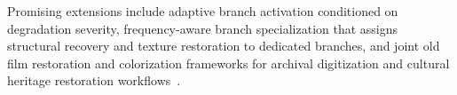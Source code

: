 Promising extensions include adaptive branch activation conditioned on degradation severity, frequency-aware branch specialization that assigns structural recovery and texture restoration to dedicated branches, and joint old film restoration and colorization frameworks for archival digitization and cultural heritage restoration workflows~\cite{kokaram2004missing}.
